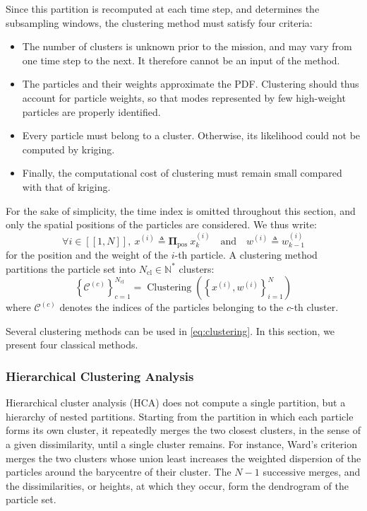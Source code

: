 Since this partition is recomputed at each time step, and determines the subsampling windows, the clustering method must satisfy four criteria:
\begin{itemize}
	\item The number of clusters is unknown prior to the mission, and may vary from one time step to the next. It therefore cannot be an input of the method.
	\item The particles and their weights approximate the PDF. Clustering should thus account for particle weights, so that modes represented by few high-weight particles are properly identified.
	\item Every particle must belong to a cluster. Otherwise, its likelihood could not be computed by kriging.
	\item Finally, the computational cost of clustering must remain small compared with that of kriging.
\end{itemize}

For the sake of simplicity, the time index is omitted throughout this section, and only the spatial positions of the particles are considered. We thus write:
\begin{equation}
	\forall i\in[\![1,N]\!],\:x^{(i)}\triangleq\boldsymbol{\Pi}_{\mathrm{pos}}\:x_k^{(i)}\quad\text{and}\quad w^{(i)}\triangleq w_{k-1}^{(i)}
\end{equation}
for the position and the weight of the $i$-th particle. A clustering method partitions the particle set into $N_{\mathrm{cl}}\in\mathbb{N}^*$ clusters:
\begin{equation}
	\left\{\mathcal{C}^{(c)}\right\}_{c=1}^{N_{\mathrm{cl}}}=\operatorname{Clustering}\left(\left\{x^{(i)},w^{(i)}\right\}_{i=1}^N\right)\label{eq:clustering}
\end{equation}
where $\mathcal{C}^{(c)}$ denotes the indices of the particles belonging to the $c$-th cluster.

Several clustering methods can be used in \eqref{eq:clustering}. In this section, we present four classical methods.

\subsubsection{Hierarchical Clustering Analysis}

Hierarchical cluster analysis (HCA) \cite{bib:HCA,bib:lance-williams} does not compute a single partition, but a hierarchy of nested partitions. Starting from the partition in which each particle forms its own cluster, it repeatedly merges the two closest clusters, in the sense of a given dissimilarity, until a single cluster remains. For instance, Ward's criterion \cite{bib:HCA} merges the two clusters whose union least increases the weighted dispersion of the particles around the barycentre of their cluster. The $N-1$ successive merges, and the dissimilarities, or heights, at which they occur, form the dendrogram of the particle set.

